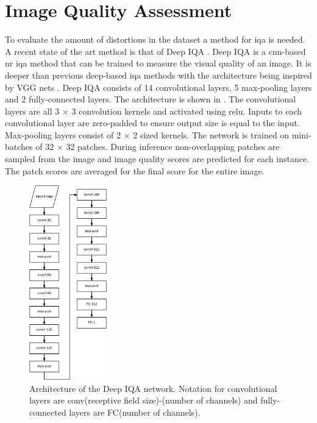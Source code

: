 \section{Image Quality Assessment}
To evaluate the amount of distortions in the dataset a method for \gls{iqa} is needed. A recent state of the art method is that of Deep IQA \cite{deepiqa}. Deep IQA is a \gls{cnn}-based \gls{nr} \gls{iqa} method that can be trained to measure the visual quality of an image. It is deeper than previous deep-based \gls{iqa} methods with the architecture being inspired by VGG nets \cite{vgg}. Deep IQA consists of 14 convolutional layers, 5 max-pooling layers and 2 fully-connected layers. The architecture is shown in . The convolutional layers are all 3 $\times$ 3 convolution kernels and activated using \gls{relu}. Inputs to each convolutional layer are zero-padded to ensure output size is equal to the input. Max-pooling layers consist of 2 $\times$ 2 sized kernels. The network is trained on mini-batches of 32 $\times$ 32 patches. During inference non-overlapping patches are sampled from the image and image quality scores are predicted for each instance. The patch scores are averaged for the final score for the entire image. 

\begin{figure}[H]
  \centering
    \includegraphics[width=0.3\textwidth]{Figs/Implementation/deepiqa_arch.pdf}
      \caption{Architecture of the Deep IQA network. Notation for convolutional layers are conv(receptive field size)-(number of channels) and fully-connected layers are FC(number of channels).}
    \label{fig:deepiqa_arch}
\end{figure}

